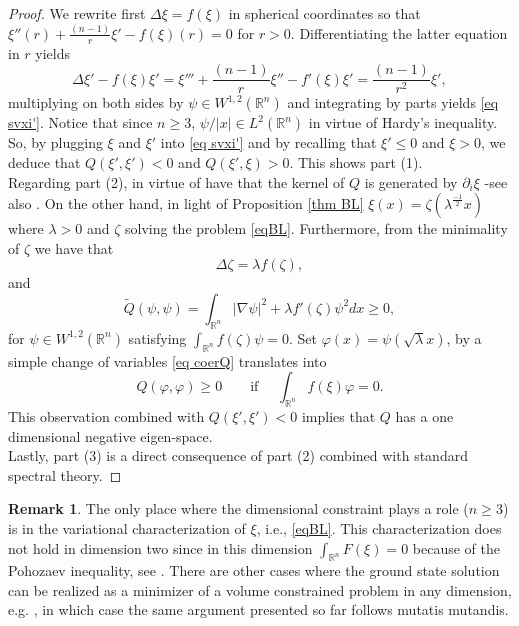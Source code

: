 \documentclass[11pt,letterpaper,reqno]{amsart}
\newcommand{\R}{\mathbb{R}}
\theoremstyle{plain}%
\theoremstyle{definition}
\newtheorem{remark}[theorem]{Remark}
\numberwithin{equation}{section}
\numberwithin{figure}{section}
\begin{document}
\begin{proof}
We rewrite first $\Delta \xi=f(\xi)$ in spherical coordinates so that $\xi''(r) + \frac{(n-1)}{r}\xi' -f(\xi)(r)=0$ for $r>0$. Differentiating the latter equation in $r$ yields
    \begin{equation}\label{eq xi'}
        \Delta \xi'-f(\xi)\xi'= \xi''' + \frac{(n-1)}{r}\xi'' -f'(\xi)\xi'= \frac{(n-1)}{r^2}\xi',
    \end{equation}
    multiplying on both sides by $\psi \in W^{1,2}(\R^n)$ and integrating by parts yields \eqref{eq svxi'}. Notice that since $n\geq 3$, $\psi/|x| \in L^2(\R^n)$ in virtue of Hardy's inequality. So, by plugging $\xi$ and $\xi'$ into \eqref{eq svxi'} and by recalling that $\xi'\leq 0$ and $\xi>0$, we deduce that $Q(\xi', \xi') <0$ and $Q(\xi', \xi)>0$. This shows part (1).\\

   Regarding part (2), in virtue of \cite[Proposition 4.1]{feireisl1997threshold} have that the kernel of $Q$ is generated by $\partial_i \xi$ -see also \cite{ni1993locating}. On the other hand, in light of Proposition \ref{thm BL} $\xi(x)= \zeta(\lambda^\frac{-1}{2} x)$ where $\lambda>0$ and $\zeta$ solving the problem \eqref{eqBL}. Furthermore, from the minimality of $\zeta$ we have that
   \begin{equation}\label{eq zeta}
       \Delta \zeta = \lambda f(\zeta),
   \end{equation}
   and
   \begin{equation}\label{eq coerQ}
       \tilde{Q}(\psi, \psi) = \int_{\R^n} |\nabla \psi|^2 + \lambda f'(\zeta)\psi^2 dx \geq 0,
   \end{equation}
   for $\psi \in W^{1,2}(\R^n)$ satisfying $\int_{\R^n} f(\zeta) \psi =0$. Set $\varphi(x) = \psi(\sqrt{\lambda} x)$, by a simple change of variables \eqref{eq coerQ} translates into 
      \begin{equation}\label{eq coerQ}
       Q(\varphi, \varphi) \geq 0\qquad \mbox{if } \quad \int_{\R^n} f(\xi)\varphi=0.
   \end{equation}
   This observation combined with $Q(\xi', \xi')<0$ implies that $Q$ has a one dimensional negative eigen-space. \\

   Lastly, part (3) is a direct consequence of part (2) combined with standard spectral theory.
\end{proof}

\begin{remark}\label{remark dimres}
    The only place where the dimensional constraint plays a role ($n\geq 3$) is in the variational characterization of $\xi$, i.e., \eqref{eqBL}. This characterization does not hold in dimension two since in this dimension $\int_{\R^n} F(\xi)=0$ because of the Pohozaev inequality, see \cite{berestycki1980existence}. There are other cases where the ground state solution can be realized as a minimizer of a volume constrained problem in any dimension, e.g. \cite{bonforte2024asymptotic}, in which case the same argument presented so far follows mutatis mutandis.
\end{remark}
\end{document}
